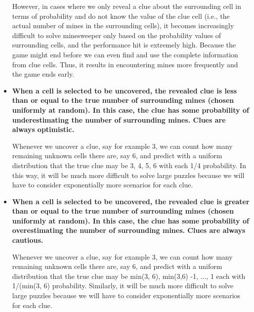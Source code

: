 \begin{itemize}
However, in cases where we only reveal a clue about the surrounding cell in terms of probability and do not know the value of the clue cell (i.e., the actual number of mines in the surrounding cells), it becomes increasingly difficult to solve minesweeper only based on the probability values of surrounding cells, and the performance hit is extremely high. Because the game might end before we can even find and use the complete information from clue cells. Thus, it results in encountering mines more frequently and the game ends early.

\item
\textbf{When a cell is selected to be uncovered, the revealed clue is less than or equal to the true number of surrounding
mines (chosen uniformly at random). In this case, the clue has some probability of underestimating the number
of surrounding mines. Clues are always optimistic.}

Whenever we uncover a clue, say for example 3, we can count how many remaining unknown cells there are, say 6, and predict with a uniform distribution that the true clue may be 3, 4, 5, 6 with each 1/4  probability. In this way, it will be much more difficult to solve large puzzles because we will have to consider exponentially more scenarios for each clue.

\item
\textbf{When a cell is selected to be uncovered, the revealed clue is greater than or equal to the true number of
surrounding mines (chosen uniformly at random). In this case, the clue has some probability of overestimating
the number of surrounding mines. Clues are always cautious.}

Whenever we uncover a clue, say for example 3, we can count how many remaining unknown cells there are, say 6, and predict with a uniform distribution that the true clue may be min(3, 6), min(3,6) -1, ..., 1 each with 1/(min(3, 6) probability. Similarly, it will be much more difficult to solve large puzzles because we will have to consider exponentially more scenarios for each clue.
\end{itemize}